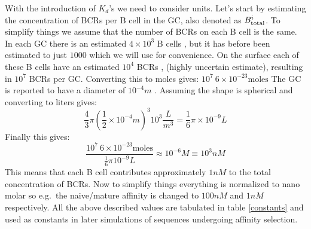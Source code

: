 With the introduction of $K_d$'s we need to consider units.
Let's start by estimating the concentration of BCRs per B cell in the GC, also denoted as $B^i_{\text{total}}$.
To simplify things we assume that the number of BCRs on each B cell is the same.
In each GC there is an estimated $4 \times 10^3$ B cells \cite{kroese1990germinal}, but it has before been estimated to just $1000$ \cite{Childs_Baskerville_Cobey_2015} which we will use for convenience.
On the surface each of these B cells have an estimated $10^4$ BCRs \cite{rieckmann2017social}, \cite{immprot} (highly uncertain estimate), resulting in $10^7$ BCRs per GC.
Converting this to moles gives: $10^7\ 6 \times 10^{-23} \text{moles}$
The GC is reported to have a diameter of $10^{-4} m$ \cite{Romppanen_1981}.
Assuming the shape is spherical and converting to liters gives:
$$
\frac{4}{3} \pi \left(\frac{1}{2} \times 10^{-4} m \right)^3 10^3 \frac{L}{m^3} = \frac{1}{6} \pi \times 10^{-9} L
$$
Finally this gives:
$$\frac{10^7\ 6 \times 10^{-23} \text{moles}}{\frac{1}{6} \pi 10^{-9} L} \approx 10^{-6} M \equiv 10^{3} nM
$$
This means that each B cell contributes approximately $1nM$ to the total concentration of BCRs.
Now to simplify things everything is normalized to nano molar so e.g.\ the naive/mature affinity is changed to $100nM$ and $1nM$ respectively.
All the above described values are tabulated in table \ref{constants} and used as constants in later simulations of sequences undergoing affinity selection.



